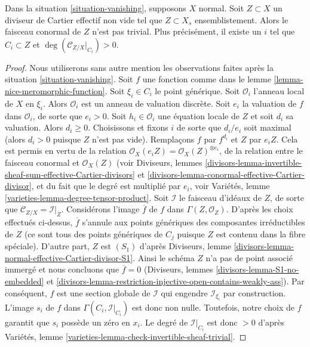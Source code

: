 \begin{lemma} \label{lemma-nontrivial-normal-bundle} Dans la situation \ref{situation-vanishing}, supposons $X$ normal. Soit $Z \subset X$ un diviseur de Cartier effectif non vide tel que $Z \subset X_s$ ensemblistement. Alors le faisceau conormal de $Z$ n'est pas trivial. Plus précisément, il existe un $i$ tel que $C_i \subset Z$ et $\deg(\mathcal{C}_{Z/X}|_{C_i}) > 0$. \end{lemma}

\begin{proof} Nous utiliserons sans autre mention les observations faites après la situation \ref{situation-vanishing}. Soit $f$ une fonction comme dans le lemme \ref{lemma-nice-meromorphic-function}. Soit $\xi_i \in C_i$ le point générique. Soit $\mathcal{O}_i$ l'anneau local de $X$ en $\xi_i$. Alors $\mathcal{O}_i$ est un anneau de valuation discrète. Soit $e_i$ la valuation de $f$ dans $\mathcal{O}_i$, de sorte que $e_i > 0$. Soit $h_i \in \mathcal{O}_i$ une équation locale de $Z$ et soit $d_i$ sa valuation. Alors $d_i \geq 0$. Choisissons et fixons $i$ de sorte que $d_i/e_i$ soit maximal (alors $d_i > 0$ puisque $Z$ n'est pas vide). Remplaçons $f$ par $f^{d_i}$ et $Z$ par $e_iZ$. Cela est permis en vertu de la relation $\mathcal{O}_X(e_i Z) = \mathcal{O}_X(Z)^{\otimes e_i}$, de la relation entre le faisceau conormal et $\mathcal{O}_X(Z)$ (voir Diviseurs, lemmes \ref{divisors-lemma-invertible-sheaf-sum-effective-Cartier-divisors} et \ref{divisors-lemma-conormal-effective-Cartier-divisor}, et du fait que le degré est multiplié par $e_i$, voir Variétés, lemme \ref{varieties-lemma-degree-tensor-product}. Soit $\mathcal{I}$ le faisceau d'idéaux de $Z$, de sorte que $\mathcal{C}_{Z/X} = \mathcal{I}|_Z$. Considérons l'image $\overline{f}$ de $f$ dans $\Gamma(Z, \mathcal{O}_Z)$. D'après les choix effectués ci-dessus, $\overline{f}$ s'annule aux points génériques des composantes irréductibles de $Z$ (ce sont tous des points génériques de $C_j$ puisque $Z$ est contenu dans la fibre spéciale). D'autre part, $Z$ est $(S_1)$ d'après Diviseurs, lemme \ref{divisors-lemma-normal-effective-Cartier-divisor-S1}. Ainsi le schéma $Z$ n'a pas de point associé immergé et nous concluons que $\overline{f} = 0$ (Diviseurs, lemmes \ref{divisors-lemma-S1-no-embedded} et \ref{divisors-lemma-restriction-injective-open-contains-weakly-ass}). Par conséquent, $f$ est une section globale de $\mathcal{I}$ qui engendre $\mathcal{I}_{\xi_i}$ par construction. L'image $s_i$ de $f$ dans $\Gamma(C_i, \mathcal{I}|_{C_i})$ est donc non nulle. Toutefois, notre choix de $f$ garantit que $s_i$ possède un zéro en $x_i$. Le degré de $\mathcal{I}|_{C_i}$ est donc $> 0$ d'après Variétés, lemme \ref{varieties-lemma-check-invertible-sheaf-trivial}. \end{proof}

